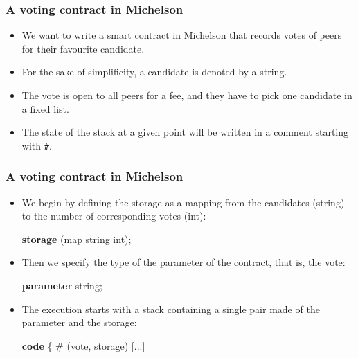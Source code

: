 \documentclass[compress,dvips,xcolor={dvipsnames},t]{beamer}
\begin{document}
\begin{frame}
  \frametitle{A voting contract in Michelson}

  \begin{itemize}

    \item We want to write a smart contract in Michelson that records
      votes of peers for their favourite candidate.

    \item For the sake of simplificity, a candidate is denoted by a
      string.

    \item The vote is open to all peers for a fee, and they have to
      pick one candidate in a fixed list.

    \item The state of the stack at a given point will be written in a
      comment starting with \texttt{\#}.

  \end{itemize}

\end{frame}

\begin{frame}[containsverbatim]
  \frametitle{A voting contract in Michelson}

  \begin{itemize}

    \item We begin by defining the storage as a mapping from the
      candidates (\textsf{string}) to the number of corresponding
      votes (\textsf{int}):
\begin{semiverbatim}
\textbf{storage} (map string int);
\end{semiverbatim}

    \item Then we specify the type of the parameter of the contract,
       that is, the vote:
\begin{semiverbatim}
\textbf{parameter} string;
\end{semiverbatim}

    \item The execution starts with a stack containing a single pair
      made of the parameter and the storage:
\begin{semiverbatim}
\textbf{code} \{
# (vote, storage)
[...]
\end{semiverbatim}

  \end{itemize}

\end{frame}
\end{document}
